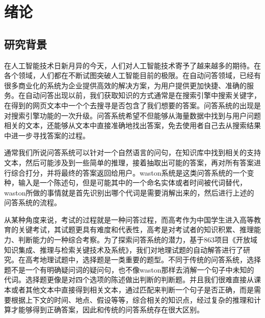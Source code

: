 \documentclass[master, winfont]{njuthesis}
\begin{document}
\tableofcontents

\listoffigures

\listoftables

\mainmatter

\chapter{绪论}\label{chapter_introduction}
\section{研究背景}
在人工智能技术日新月异的今天，人们对人工智能技术寄予了越来越多的期待。在各个领域，人们都在不断试图突破人工智能目前的极限。在自动问答领域，已经有很多商业化的系统为企业提供高效的解决方案，为用户提供更加快捷、准确的服务。在自动问答出现以前，我们获取知识的方式通常是在搜索引擎中搜索关键字，在得到的网页文本中一个个去搜寻是否包含了我们想要的答案。问答系统的出现是对搜索引擎功能的一次升级。问答系统希望不但能够从海量数据中找到与用户问题相关的文本，还能够从文本中直接准确地找出答案，免去使用者自己去从搜索结果中进一步寻找答案的过程。

通常我们所说问答系统可以针对一个自然语言的问句，在知识库中找到相关的支持文本，然后可能涉及到一些简单的推理，接着抽取出可能的答案，再对所有答案进行综合打分，并将最终的答案返回给用户。waston系统是这类问答系统的一个变种，输入是一个陈述句，但是可能其中的一个命名实体或者时间被代词替代，waston所做的事情就是首先识别出哪个代词是需要消解出来的，然后进行上述的问答系统的流程\cite{Ferrucci2010}。

从某种角度来说，考试的过程就是一种问答过程，而高考作为中国学生进入高等教育的关键考试，其试题更具有难度和代表性，高考是对考试者的知识积累、推理能力、判断能力的一种综合考察。为了探索问答系统的潜力，基于863项目《开放域知识集成、推理与检索关键技术及系统》，我们对地理试题的自动解答进行了研究。在高考地理试题中，选择题是一类重要的题型。不同于传统的问答系统，选择题不是一个有明确疑问词的疑问句，也不像waston那样去消解一个句子中未知的代词。选择题更像是对四个选项的陈述做出判断的判断题。并且我们很难直接从课本或者其他文本中直接得到相关文本，通过匹配来判断一个句子是否正确，而是需要根据上下文的时间、地点、假设等等，综合相关的知识点，经过复杂的推理和计算才能够得到正确答案，因此和传统的问答系统存在很大区别。
\end{document}
